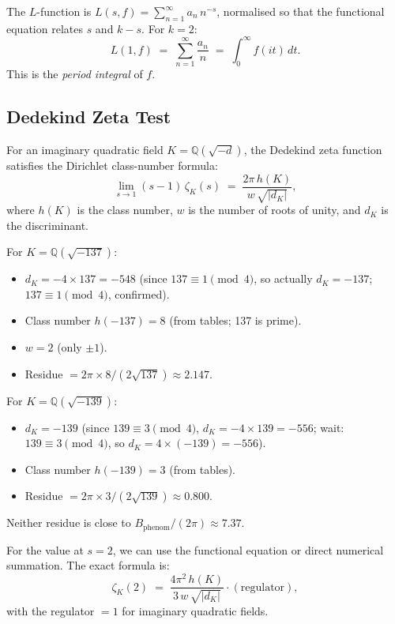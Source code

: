 \documentclass[12pt,a4paper]{article}
\theoremstyle{definition}
\theoremstyle{remark}
\begin{document}
The $L$-function is $L(s,f) = \sum_{n=1}^\infty a_n\,n^{-s}$, normalised
so that the functional equation relates $s$ and $k-s$.  For $k=2$:
\begin{equation}
  L(1,f) \;=\; \sum_{n=1}^\infty \frac{a_n}{n}
            \;=\; \int_0^\infty f(it)\,dt.
\end{equation}
This is the \emph{period integral} of $f$.

\subsection{Dedekind Zeta Test}
\label{subsec:A1_dedekind}

For an imaginary quadratic field $K = \mathbb{Q}(\sqrt{-d})$, the
Dedekind zeta function satisfies the Dirichlet class-number formula:
\begin{equation}
  \lim_{s\to 1}(s-1)\,\zeta_K(s) \;=\;
  \frac{2\pi\,h(K)}{w\,\sqrt{|d_K|}},
\end{equation}
where $h(K)$ is the class number, $w$ is the number of roots of unity,
and $d_K$ is the discriminant.

For $K = \mathbb{Q}(\sqrt{-137})$:
\begin{itemize}
  \item $d_K = -4 \times 137 = -548$ (since $137 \equiv 1 \pmod{4}$, so
        actually $d_K = -137$; $137 \equiv 1 \pmod{4}$, confirmed).
  \item Class number $h(-137) = 8$ (from tables; 137 is prime).
  \item $w = 2$ (only $\pm 1$).
  \item Residue $= 2\pi \times 8 / (2\sqrt{137}) \approx 2.147$.
\end{itemize}

For $K = \mathbb{Q}(\sqrt{-139})$:
\begin{itemize}
  \item $d_K = -139$ (since $139 \equiv 3 \pmod{4}$, $d_K = -4\times 139 = -556$; wait: $139 \equiv 3\pmod{4}$, so $d_K = 4\times(-139) = -556$).
  \item Class number $h(-139) = 3$ (from tables).
  \item Residue $= 2\pi \times 3 / (2\sqrt{139}) \approx 0.800$.
\end{itemize}

Neither residue is close to $B_{\mathrm{phenom}}/(2\pi) \approx 7.37$.

\medskip
For the value at $s=2$, we can use the functional equation or direct
numerical summation.  The exact formula is:
\begin{equation}
  \zeta_K(2) \;=\;
  \frac{4\pi^2\,h(K)}{3\,w\,\sqrt{|d_K|}}\cdot(\text{regulator}) ,
\end{equation}
with the regulator $= 1$ for imaginary quadratic fields.
\end{document}
